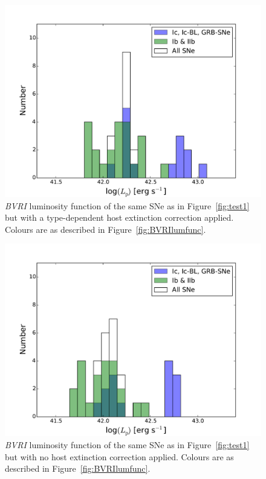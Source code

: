 \documentclass[a4paper,fleqn,usenatbib]{mnras}
\begin{document}
\begin{figure}
\centering
\includegraphics[scale=0.4]{BVRI_luminosity_function-medE.pdf}
\caption{\textit{BVRI} luminosity function of the same SNe as in Figure~\ref{fig:test1} but with a type-dependent host extinction correction applied. Colours are as described in Figure~\ref{fig:BVRIlumfunc}.}
\label{fig:test2}
\end{figure}

\begin{figure}
\centering
\includegraphics[scale=0.4]{BVRI_luminosity_function-noE.pdf}
\caption{\textit{BVRI} luminosity function of the same SNe as in Figure~\ref{fig:test1} but with no host extinction correction applied. Colours are as described in Figure~\ref{fig:BVRIlumfunc}.}
\label{fig:test3}
\end{figure}
\end{document}
